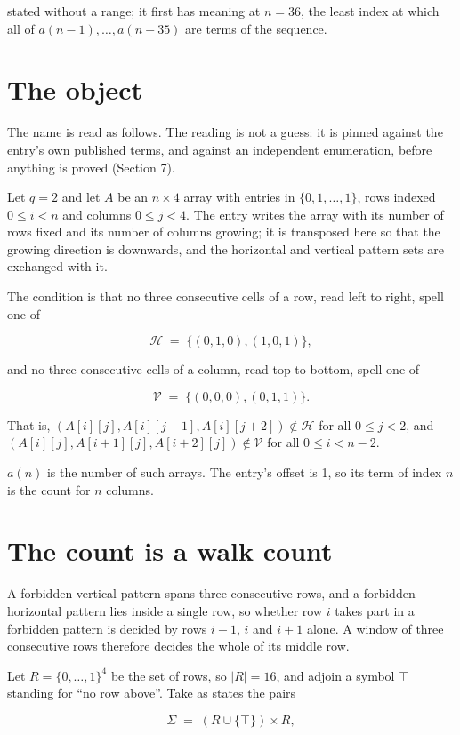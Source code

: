 \documentclass[11pt]{article}
\theoremstyle{definition}
\begin{document}
stated without a range; it first has meaning at $n = 36$, the least index at which all of $a(n-1),\dots,a(n-35)$ are terms of the sequence.

\section{The object}

The name is read as follows. The reading is not a guess: it is pinned against the entry's own published terms, and against an independent enumeration, before anything is proved (Section 7).

Let $q = 2$ and let $A$ be an $n \times 4$ array with entries in $\{0,1,\dots,1\}$, rows indexed $0 \le i < n$ and columns $0 \le j < 4$. The entry writes the array with its number of rows fixed and its number of columns growing; it is transposed here so that the growing direction is downwards, and the horizontal and vertical pattern sets are exchanged with it.

The condition is that no three consecutive cells of a row, read left to right, spell one of

\[\mathcal{H} \;=\; \{(0,1,0), (1,0,1)\},\]

and no three consecutive cells of a column, read top to bottom, spell one of

\[\mathcal{V} \;=\; \{(0,0,0), (0,1,1)\}.\]

That is, $(A[i][j],A[i][j{+}1],A[i][j{+}2]) \notin \mathcal{H}$ for all $0 \le j < 2$, and $(A[i][j],A[i{+}1][j],A[i{+}2][j]) \notin \mathcal{V}$ for all $0 \le i < n-2$.

$a(n)$ is the number of such arrays. The entry's offset is 1, so its term of index $n$ is the count for $n$ columns.

\section{The count is a walk count}

A forbidden vertical pattern spans three consecutive rows, and a forbidden horizontal pattern lies inside a single row, so whether row $i$ takes part in a forbidden pattern is decided by rows $i-1$, $i$ and $i+1$ alone. A window of three consecutive rows therefore decides the whole of its middle row.

Let $R = \{0,\dots,1\}^{4}$ be the set of rows, so $|R| = 16$, and adjoin a symbol $\top$ standing for ``no row above''. Take as states the pairs

\[\Sigma \;=\; (R \cup \{\top\}) \times R,\]
\end{document}
